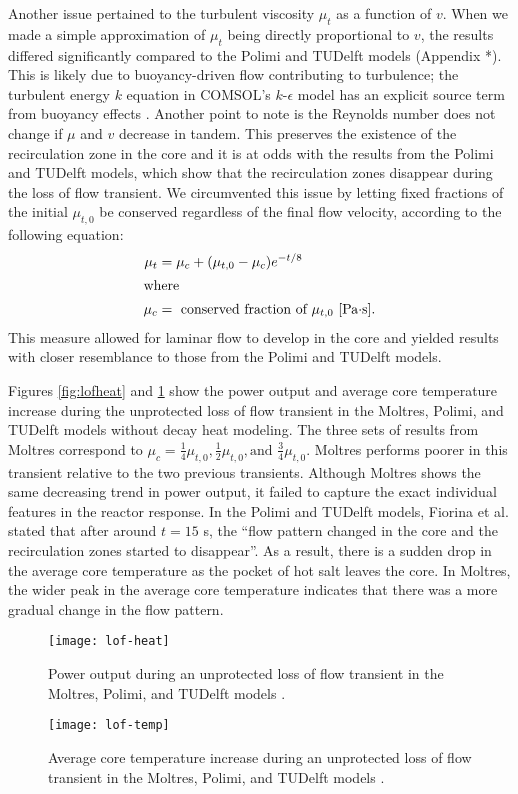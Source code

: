 Another issue pertained to the turbulent viscosity $\mu_t$ as a function of
$v$. When we made a simple approximation of $\mu_t$ being directly
proportional to $v$, the results differed significantly compared to the Polimi
and TUDelft models (Appendix *). This is likely due to buoyancy-driven flow
contributing to turbulence; the turbulent energy $k$ equation in COMSOL's
$k$-$\epsilon$ model has an explicit source term from buoyancy effects
\cite{comsol_ab_comsol_2018}. Another point to note is the
Reynolds number does not change if $\mu$ and $v$ decrease in tandem. This
preserves the existence of the recirculation zone in the core and it is at
odds with the results from the Polimi and TUDelft models, which show that the
recirculation zones disappear during the loss of flow transient. We
circumvented this issue by letting fixed fractions of the initial $\mu_{t,0}$
be conserved regardless of the final flow velocity, according to the following
equation:
%
\begin{align}
    \mu_t &= \mu_c + (\mu_{t,0} - \mu_c) e^{-t/8} \label{lofmu} \\
    \intertext{where}
    \mu_c &= \text{ conserved fraction of $\mu_{t,0}$ [Pa$\cdot$s].} \nonumber
\end{align}
%
This measure allowed for laminar flow to develop in the core and yielded
results with closer resemblance to those from the Polimi and TUDelft models.

Figures \ref{fig:lofheat} and \ref{fig:loftemp} show the power output and
average core temperature increase during the unprotected loss of flow
transient in the Moltres, Polimi, and TUDelft models without decay heat
modeling. The three sets of results from Moltres correspond to $\mu_c =
\frac{1}{4} \mu_{t,0}, \frac{1}{2} \mu_{t,0}, \text{and } \frac{3}{4}
\mu_{t,0}$. Moltres
performs poorer in this transient relative to the two previous transients.
Although Moltres shows the same decreasing trend in power output, it failed to
capture the exact individual features in the reactor response. In the Polimi 
and TUDelft models, Fiorina et al.
stated that after around $t=15$ s, the ``flow pattern changed in the core and
the recirculation zones started to disappear''. As a result, there is a sudden
drop in the average core temperature as the pocket of hot salt leaves the
core. In Moltres, the wider peak in the average core temperature
indicates that there was a more gradual change in the flow pattern.

\begin{figure}[htbp!]
    \centering
    \texttt{[image: lof-heat]}
    \caption{Power output during
    an unprotected loss of flow transient in the Moltres, Polimi, and
    TUDelft models \cite{fiorina_modelling_2014}.}
    \label{fig:lofheat}
    \texttt{[image: lof-temp]}
    \caption{Average core temperature increase during
    an unprotected loss of flow transient in the Moltres, Polimi, and
    TUDelft models \cite{fiorina_modelling_2014}.}
    \label{fig:loftemp}
\end{figure}

